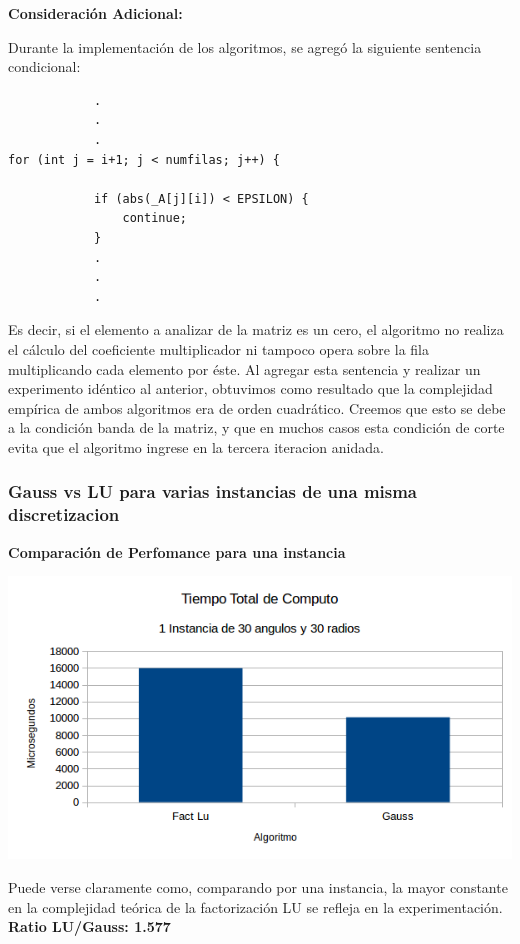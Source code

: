 \textbf{Consideraci\'on Adicional:} 

Durante la implementaci\'on de los algoritmos, se agreg\'o la siguiente sentencia condicional:

\begin{lstlisting}
			.
			.
			.
for (int j = i+1; j < numfilas; j++) {

            if (abs(_A[j][i]) < EPSILON) {
                continue;
            }
			.
			.
			.
\end{lstlisting}

Es decir, si el elemento a analizar de la matriz es un cero, el algoritmo no realiza el c\'alculo del coeficiente multiplicador ni tampoco opera sobre la fila multiplicando cada elemento por \'este. Al agregar esta sentencia y realizar un experimento id\'entico al anterior, obtuvimos como resultado que la complejidad emp\'irica de ambos algoritmos era de orden cuadr\'atico. Creemos que esto se debe a la condición banda de la matriz, y que en muchos casos esta condición de corte evita que el algoritmo ingrese en la tercera iteracion anidada.

\subsubsection{Gauss vs LU para varias instancias de una misma discretizacion}


\vspace{0.5cm}

  	\textbf{Comparaci\'on de Perfomance para una instancia}\\
\begin{center}
\includegraphics[scale=0.7]{experimentos2a_2b/2bUnaInstancia.png}
\end{center}

Puede verse claramente como, comparando por una instancia, la mayor constante en la complejidad te\'orica de la factorizaci\'on LU se refleja en la experimentaci\'on. \textbf{Ratio LU/Gauss: 1.577}

